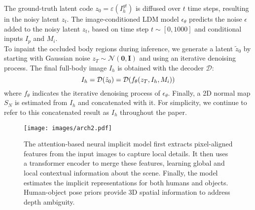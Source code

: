 The ground-truth latent code $z_0 = \varepsilon(I^{gt}_h)$ is diffused over 
$t$ time steps, resulting in the noisy latent $z_t$. The image-conditioned LDM model $\epsilon_{\theta}$ predicts the noise $\epsilon$ added to the noisy latent $z_t$, based on time step $t \sim [0, 1000]$ and conditional inputs $I_p$ and $M_i$.
\\To inpaint the occluded body regions during inference, we generate a latent $\tilde{z}_0$ by starting with Gaussian noise $z_T \sim \mathcal{N}(\textbf{0},\textbf{I})$ and using an iterative denoising process. The final full-body image $I_h$ is  obtained with the decoder $\mathcal{D}$:
\vspace{-0.2cm}
\begin{equation}
    I_h=\mathcal{D}(\tilde{z}_0)=\mathcal{D}(f_{\theta}(z_T,I_h,M_i))
\vspace{-0.2cm}
\end{equation}
where $f_{\theta}$ indicates the iterative denoising process of $\epsilon_{\theta}$.
Finally, a 2D normal map $S_N$ is estimated from $I_h$ and concatenated with it. For simplicity, we continue to refer to this concatenated result as $I_h$ throughout the paper.
%
\begin{figure}
  \centering
\texttt{[image: images/arch2.pdf]}
\vspace{-8mm}
\caption{The attention-based neural implicit model first extracts pixel-aligned features from the input images to capture local details. It then uses a transformer encoder to merge these features, learning global and local contextual information about the scene. Finally, the model estimates the implicit representations for both humans and objects. Human-object pose priors provide 3D spatial information to address depth ambiguity.}
\label{fig:fig_module}
\vspace{-6mm}
\end{figure}
